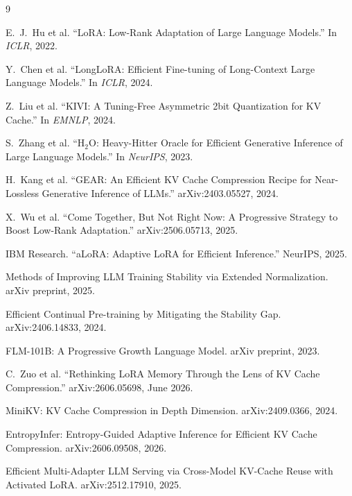 \documentclass[11pt]{article}
\begin{document}

\begin{thebibliography}{9}

E.~J.~Hu et al.
``LoRA: Low-Rank Adaptation of Large Language Models.''
In \emph{ICLR}, 2022.

Y.~Chen et al.
``LongLoRA: Efficient Fine-tuning of Long-Context Large Language Models.''
In \emph{ICLR}, 2024.

Z.~Liu et al.
``KIVI: A Tuning-Free Asymmetric 2bit Quantization for KV Cache.''
In \emph{EMNLP}, 2024.

S.~Zhang et al.
``H$_2$O: Heavy-Hitter Oracle for Efficient Generative Inference of Large Language Models.''
In \emph{NeurIPS}, 2023.

H.~Kang et al.
``GEAR: An Efficient KV Cache Compression Recipe for Near-Lossless Generative Inference of LLMs.''
arXiv:2403.05527, 2024.

X.~Wu et al.
``Come Together, But Not Right Now: A Progressive Strategy to Boost Low-Rank Adaptation.''
arXiv:2506.05713, 2025.

IBM Research.
``aLoRA: Adaptive LoRA for Efficient Inference.''
NeurIPS, 2025.


Methods of Improving LLM Training Stability via Extended Normalization.
arXiv preprint, 2025.

Efficient Continual Pre-training by Mitigating the Stability Gap.
arXiv:2406.14833, 2024.

FLM-101B: A Progressive Growth Language Model.
arXiv preprint, 2023.

C.~Zuo et al.
``Rethinking LoRA Memory Through the Lens of KV Cache Compression.''
arXiv:2606.05698, June 2026.

MiniKV: KV Cache Compression in Depth Dimension.
arXiv:2409.0366, 2024.

EntropyInfer: Entropy-Guided Adaptive Inference for Efficient KV Cache Compression.
arXiv:2606.09508, 2026.

Efficient Multi-Adapter LLM Serving via Cross-Model KV-Cache Reuse with Activated LoRA.
arXiv:2512.17910, 2025.
\end{thebibliography}
\end{document}
